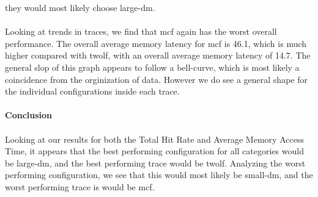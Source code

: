 \documentclass[12pt]{article}
\begin{document}
they would most likely choose large-dm.
\\\\
Looking at trends in traces, we find that mcf again has the worst
overall performance. The overall average memory latency for mcf
is 46.1, which is much higher compared with twolf, with an
overall average memory latency of 14.7. The general slop of this
graph appears to follow a bell-curve, which is most likely a
coincidence from the orginization of data. However we do see
a general shape for the individual configurations
inside each trace.
\\\\
{\bf Conclusion}\\\\
Looking at our results for both the Total Hit Rate and Average
Memory Access Time, it appears that the best performing
configuration for all categories would be large-dm, and the best
performing trace would be twolf. Analyzing the worst performing
configuration, we see that this would most likely be small-dm,
and the worst performing trace is would be mcf.
\end{document}
